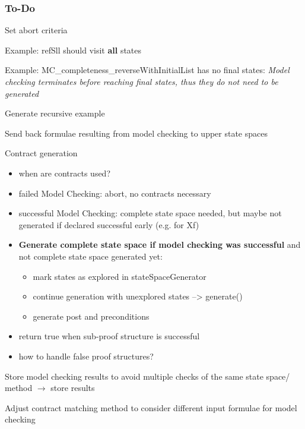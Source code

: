 \documentclass[a4paper,12pt]{article}
\newcommand{\cmark}{\ding{51}}%
\newcommand{\xmark}{\ding{55}}%
\newcommand{\done}{\rlap{$\square$}{\raisebox{2pt}{\large\hspace{1pt}\cmark}}%
\hspace{-2.5pt}}
\newcommand{\wontfix}{\rlap{$\square$}{\large\hspace{1pt}\xmark}}
\begin{document}
\subsubsection{To-Do}
\begin{todolist}
	
	\item[\done] Set abort criteria	
	\item[\done] Example: refSll should visit \textbf{all} states
	\item[\done] Example: MC\_completeness\_reverseWithInitialList has no final states: \textit{Model checking terminates before reaching final states, thus they do not need to be generated}
	\item[\done] Generate recursive example
	\item[\done] Send back formulae resulting from model checking to upper state spaces 
	\item[\done] Contract generation
	\begin{itemize}
		\item when are contracts used? 
		\item failed Model Checking: abort, no contracts necessary
		\item successful Model Checking: complete state space needed, but maybe not generated if declared successful early (e.g. for Xf)
		\item \textbf{ Generate complete state space if model checking was successful} and not complete state space generated yet: 
		\begin{itemize}
			\item mark states as explored in stateSpaceGenerator 
			\item continue generation with unexplored states --> generate() 
			\item generate post and preconditions
		\end{itemize} 
		\item return true when sub-proof structure is successful
		\item how to handle false proof structures? 
	\end{itemize}
	\item[\done] Store model checking results to avoid multiple checks of the same state space/ method $\rightarrow$ store results
	\item[\done] Adjust contract matching method to consider different input formulae for model checking

\end{todolist}
\end{document}
